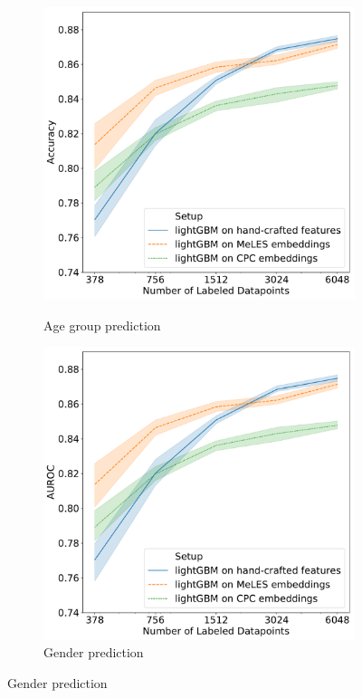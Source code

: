\documentclass{article}
\begin{document}
\begin{figure}
  \centering
  \begin{subfigure}{0.5\textwidth}
    \caption{Age group prediction}
    \includegraphics[width=\textwidth]{figures/ss_age_0.pdf}
    \label{fig-semi-age-0}
  \end{subfigure}%
  \begin{subfigure}{0.5\textwidth}
    \caption{Gender prediction}
    \includegraphics[width=\textwidth]{figures/ss_gen_0.pdf}

\end{subfigure}
\end{figure}
\end{document}
